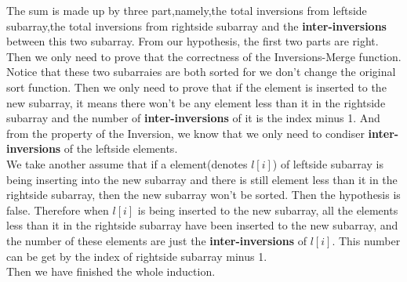 \documentclass[oneside]{homework} %
\begin{document}
	\indent The sum is made up by three part,namely,the total inversions from leftside subarray,the total inversions from rightside subarray and the \textbf{inter-inversions} between this two subarray. From our hypothesis, the first two parts are right. Then we only need to prove that the correctness of the Inversions-Merge function. Notice that these two subarraies are both sorted for we don't change the original sort function. Then we only need to prove that if the element is inserted to the new subarray, it means there won't be any element less than it in the rightside subarray and the number of \textbf{inter-inversions} of it is the index minus 1. And from the property of the Inversion, we know that we only need to condiser \textbf{inter-inversions} of the leftside elements.\\
	\indent We take another assume that if a element(denotes $l[i]$) of leftside subarray is being inserting into the new subarray and there is still element less than it in the rightside subarray, then the new subarray won't be sorted. Then the hypothesis is false. Therefore when $l[i]$ is being inserted to the new subarray, all the elements less than it in the rightside subarray have been inserted  to the new subarray, and the number of these elements are just the \textbf{inter-inversions} of $l[i]$. This number can be get by the index of rightside subarray minus 1.\\
	Then we have finished the whole induction.
\end{document}
